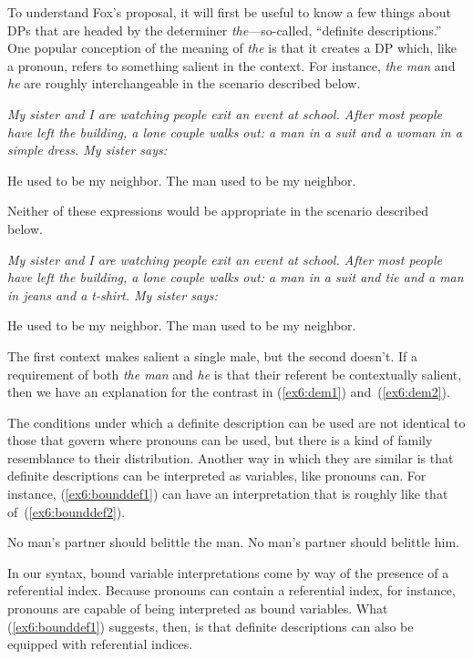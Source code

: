To understand Fox's proposal, it will first be useful to know a few things about DPs that are headed by the determiner \emph{the}---so-called, ``definite descriptions.'' One popular conception of the meaning of \emph{the} is that it creates a DP which, like a pronoun, refers to something salient in the context. For instance, \emph{the man} and \emph{he} are roughly interchangeable in the scenario described below.
\begin{exe}
\raggedright
	\ex \label{ex6:dem1} \emph{My sister and I are watching people exit an event at school. After most people have left the building, a lone couple walks out: a man in a suit and a woman in a simple dress. My sister says:}
	\begin{xlist}
		\ex He used to be my neighbor.
		\ex The man used to be my neighbor.
	\end{xlist}
\end{exe}
Neither of these expressions would be appropriate in the scenario described below.
\pagebreak
\begin{exe}
\raggedright
	\ex \label{ex6:dem2} \emph{My sister and I are watching people exit an event at school. After most people have left the building, a lone couple walks out: a man in a suit and tie and a man in jeans and a t-shirt. My sister says:}
	\begin{xlist}
		\ex He used to be my neighbor.
		\ex The man used to be my neighbor.
	\end{xlist}
\end{exe}
The first context makes salient a single male, but the second doesn't. If a requirement of both \emph{the man} and \emph{he} is that their referent be contextually salient, then we have an explanation for the contrast in (\ref{ex6:dem1}) and~(\ref{ex6:dem2}). 

The conditions under which a definite description can be used are not identical to those that govern where pronouns can be used, but there is a kind of family resemblance to their distribution. Another way in which they are similar is that definite descriptions can be interpreted as variables, like pronouns can. For instance, (\ref{ex6:bounddef1}) can have an interpretation that is roughly like that of~(\ref{ex6:bounddef2}).%
%
%
%
\begin{exe}
\raggedright
	\ex \label{ex6:bounddef}
	\begin{xlist}
		\ex \label{ex6:bounddef1} No man's partner should belittle the man.
		\ex \label{ex6:bounddef2} No man's partner should belittle him.
	\end{xlist}
\end{exe}
In our syntax, bound variable interpretations come by way of the presence of a referential index. Because pronouns can contain a referential index, for instance, pronouns are capable of being interpreted as bound variables. What (\ref{ex6:bounddef1}) suggests, then, is that definite descriptions can also be equipped with referential indices.


